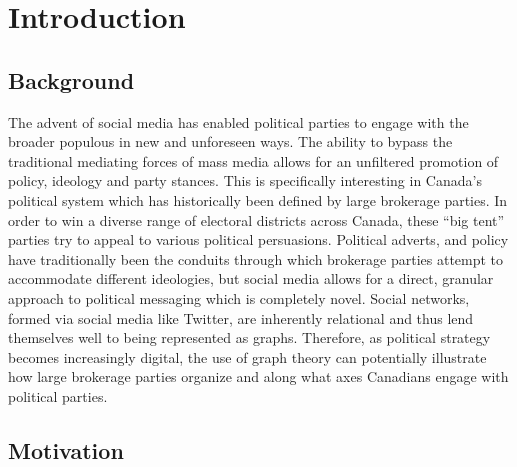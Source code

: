 \chapter{Introduction}

\section{Background}

The advent of social media has enabled political parties to engage with the
broader populous in new and unforeseen ways. The ability to bypass the
traditional mediating forces of mass media allows for an unfiltered promotion of
policy, ideology and party stances. This is specifically interesting in Canada’s
political system which has historically been defined by large brokerage parties.
In order to win a diverse range of electoral districts across Canada, these “big
tent” parties try to appeal to various political persuasions. Political adverts,
and policy have traditionally been the conduits through which brokerage parties
attempt to accommodate different ideologies, but social media allows for a
direct, granular approach to political messaging which is completely novel.
Social networks, formed via social media like Twitter, are inherently relational
and thus lend themselves well to being represented as graphs. Therefore, as
political strategy becomes increasingly digital, the use of graph theory can
potentially illustrate how large brokerage parties organize and along what axes
Canadians engage with political parties.

\section{Motivation}\label{sec:motivation}

